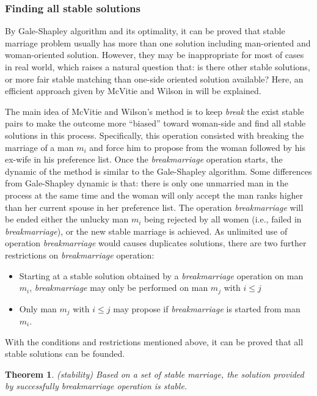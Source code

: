 \documentclass[14pt]{extarticle}
\newtheorem{theorem}{Theorem}
\begin{document}
\subsubsection{Finding all stable solutions} \label{all stable solutions}

By Gale-Shapley algorithm and its optimality, it can be proved that stable marriage problem usually has more than one solution including man-oriented and woman-oriented solution. 
However, they may be inappropriate for most of cases in real world, which raises a natural question that: 
is there other stable solutions, or more fair stable matching than one-side oriented solution available? 
Here, an efficient approach given by McVitie and Wilson in \cite{McVitie&Wilson} will be explained.

The main idea of McVitie and Wilson’s method is to keep {\it break} the exist stable pairs to make the outcome more “biased” toward woman-side and find all stable solutions in this process. 
Specifically, this operation consisted with breaking the marriage of a man $m_i$ and force him to propose from the woman followed by his ex-wife in his preference list.
Once the {\it breakmarriage} operation starts, the dynamic of the method is similar to the Gale-Shapley algorithm.
Some differences from Gale-Shapley dynamic is that: 
there is only one unmarried man in the process at the same time and the woman will only accept the man ranks higher than her current spouse in her preference list.
The operation {\it breakmarriage} will be ended either the unlucky man $m_i$ being rejected by all women (i.e., failed in {\it breakmarriage}), or the new stable marriage is achieved.
As unlimited use of operation {\it breakmarriage} would causes duplicates solutions, there are two further restrictions on {\it breakmarriage} operation: \cite{McVitie&Wilson}

\begin{itemize}
  \item Starting at a stable solution obtained by a {\it breakmarriage} operation on man $m_i$, {\it breakmarriage} may only be performed on man $m_j$ with $i \leq j$
  \item Only man $m_j$ with $i \leq j$ may propose if {\it breakmarriage} is started from man $m_i$.
\end{itemize}

With the conditions and restrictions mentioned above, it can be proved that all stable solutions can be founded.

\begin{theorem}
  (stability)
  Based on a set of stable marriage, the solution provided by successfully breakmarriage operation is stable. \cite{McVitie&Wilson}
\end{theorem}
\end{document}
